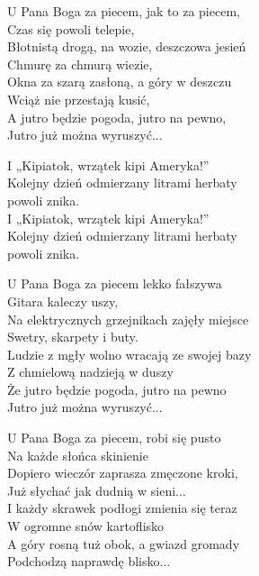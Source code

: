 \begin{text}

    U Pana Boga za piecem, jak to za piecem,\\
    Czas się powoli telepie,\\
    Błotnistą drogą, na wozie, deszczowa jesień\\
    Chmurę za chmurą wiezie,\\
    Okna za szarą zasłoną, a góry w deszczu\\
    Wciąż nie przestają kusić,\\
    A jutro będzie pogoda, jutro na pewno,\\
    Jutro już można wyruszyć...

    \vin I „Kipiatok, wrzątek kipi Ameryka!”\\
    \vin Kolejny dzień odmierzany litrami herbaty\\
	\vin powoli znika.\\
    \vin I „Kipiatok, wrzątek kipi Ameryka!”\\
    \vin Kolejny dzień odmierzany litrami herbaty\\
	\vin powoli znika.

    U Pana Boga za piecem lekko fałszywa\\
    Gitara kaleczy uszy,\\
    Na elektrycznych grzejnikach zajęły miejsce\\
    Swetry, skarpety i buty.\\
    Ludzie z mgły wolno wracają ze swojej bazy\\
    Z chmielową nadzieją w duszy\\
    Że jutro będzie pogoda, jutro na pewno\\
    Jutro już można wyruszyć...

    U Pana Boga za piecem, robi się pusto\\
    Na każde słońca skinienie\\
    Dopiero wieczór zaprasza zmęczone kroki,\\
    Już słychać jak dudnią w sieni...\\
    I każdy skrawek podłogi zmienia się teraz\\
    W ogromne snów kartoflisko\\
    A góry rosną tuż obok, a gwiazd gromady\\
    Podchodzą naprawdę blisko...
    
\end{text}
